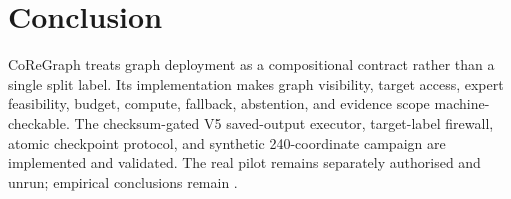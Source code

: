 \section{Conclusion}

CoReGraph treats graph deployment as a compositional contract rather than a
single split label. Its implementation makes graph visibility, target access,
expert feasibility, budget, compute, fallback, abstention, and evidence scope
machine-checkable. The checksum-gated V5 saved-output executor, target-label
firewall, atomic checkpoint protocol, and synthetic 240-coordinate campaign are
implemented and validated. The real pilot remains separately authorised and
unrun; empirical conclusions remain \pending.
